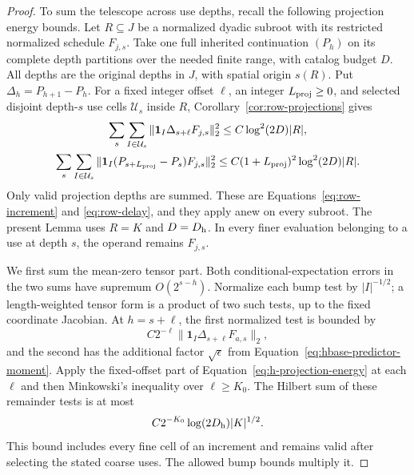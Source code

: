 \begin{proof}
To sum the telescope across use depths, recall the following
projection energy bounds.  Let \(R\subseteq J\) be a normalized dyadic
subroot with its restricted normalized schedule \(F_{j,s}\).  Take one
full inherited continuation \((P_h)\) on its complete depth partitions
over the needed finite range, with catalog budget \(D\).  All depths
are the original depths in \(J\), with spatial origin \(s(R)\).  Put
\(\Delta_h=P_{h+1}-P_h\).  For a fixed integer offset \(\ell\), an
integer \(L_{\rm proj}\ge0\), and selected disjoint depth-\(s\) use cells
\(\mathcal U_s\) inside \(R\), Corollary~\ref{cor:row-projections} gives
\begin{equation}
 \begin{gathered}
 \sum_s\sum_{I\in\mathcal U_s}
   \|\mathbf1_I\Delta_{s+\ell}F_{j,s}\|_2^2
       \le C\log^2(2D)|R|,\\
 \sum_s\sum_{I\in\mathcal U_s}
   \|\mathbf1_I(P_{s+L_{\rm proj}}-P_s)F_{j,s}\|_2^2
       \le C(1+L_{\rm proj})^2\log^2(2D)|R|.
 \end{gathered}                                               \label{eq:h-projection-energy}
\end{equation}
Only valid projection depths are summed.  These are
Equations~\eqref{eq:row-increment} and \eqref{eq:row-delay}, and they
apply anew on every subroot.  The present Lemma uses \(R=K\) and
\(D=D_{\rm h}\).  In every finer evaluation belonging to a use at depth
\(s\), the operand remains \(F_{j,s}\).

We first sum the mean-zero tensor part.  Both conditional-expectation
errors in the two sums have supremum \(O(2^{s-h})\).  Normalize each
bump test by \(|I|^{-1/2}\); a length-weighted tensor form is a
product of two such tests, up to the fixed coordinate Jacobian.
At \(h=s+\ell\), the first normalized test is bounded by
\[
 C2^{-\ell}\|\mathbf1_I\Delta_{s+\ell}F_{a,s}\|_2,
\]
and the second has the additional factor \(\sqrt\epsilon\) from
Equation~\eqref{eq:hbase-predictor-moment}.  Apply the fixed-offset
part of Equation~\eqref{eq:h-projection-energy} at each \(\ell\)
and then Minkowski's inequality over \(\ell\ge K_0\).  The Hilbert
sum of these remainder tests is at most
\begin{equation}
 C2^{-K_0}\log(2D_{\rm h})|K|^{1/2}.                           \label{eq:hbase-predictor-remainder}
\end{equation}
This bound includes every fine cell of an increment and remains
valid after selecting the stated coarse uses.  The allowed bump
bounds multiply it.


\end{proof}
